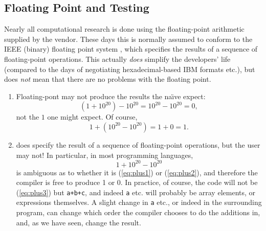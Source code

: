 \subsection{Floating Point and Testing}
Nearly all computational research is done using the floating-point arithmetic supplied by the vendor. These days this is normally assumed to conform to the IEEE (binary) floating point system \cite{IEEE2008}, which specifies the results of a sequence of floating-point operations. This actually \emph{does} simplify the developers' life (compared to the days of negotiating hexadecimal-based IBM formats etc.), but does \emph{not} mean that there are no problems with the floating point. 

\begin{enumerate}
\item Floating-pont may not produce the results the na\"\i{}ve expect:
\begin{equation}\label{eq:plus1}
\left(1+10^{20}\right)-10^{20}=10^{20}-10^{20}=0,
\end{equation}
not the $1$ one might expect. Of course,
\begin{equation}\label{eq:plus2}
1+\left(10^{20}-10^{20}\right)=1+0=1.
\end{equation}
\item \cite{IEEE2008} does specify the result of a sequence of floating-point operations, but the user may not! In particular, in most programming languages, 
\begin{equation}\label{eq:plus3}
1+10^{20}-10^{20}
\end{equation}
is ambiguous as to whether it is (\ref{eq:plus1}) or  (\ref{eq:plus2}), and therefore the compiler is free to produce 1 or 0. In practice, of course, the code will not be (\ref{eq:plus3}) but \verb!a+b+c!, and indeed \verb!a! etc. will probably be array elements, or expressions themselves. A slight change in \verb!a! etc., or indeed in the surrounding program, can change which order the compiler chooses to do the additions in, and, as we have seen, change the result.
\end{enumerate}
